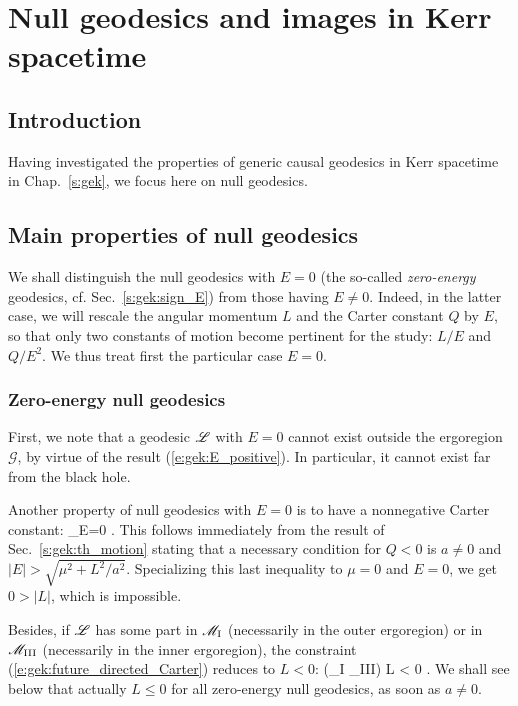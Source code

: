 \chapter{Null geodesics and images in Kerr spacetime}
\label{s:gik}

\minitoc

\section{Introduction}

Having investigated the properties of generic causal geodesics
in Kerr spacetime in Chap.~\ref{s:gek}, we focus here on null
geodesics.


\section{Main properties of null geodesics} \label{s:gik:properties}

We shall distinguish the null geodesics with $E=0$ (the so-called \emph{zero-energy} geodesics,
cf. Sec.~\ref{s:gek:sign_E})
 from those having
$E \neq 0$. Indeed, in the latter case, we will rescale the angular momentum
$L$ and the Carter constant $Q$ by $E$, so that only two constants of motion become
pertinent for the study: $L/E$ and $Q/E^2$.
We thus treat first the particular case $E=0$.

\subsection{Zero-energy null geodesics} \label{s:gik:zero_energy}

First, we note that a geodesic $\mathscr{L}$ with $E=0$ cannot exist outside the ergoregion
$\mathscr{G}$, by virtue of the result (\ref{e:gek:E_positive}). In particular,
it cannot exist far from the black hole.

Another property of null geodesics with $E=0$ is to have a nonnegative Carter constant:
\be \label{e:gik:Q_nonneg_E_zero}
   _{E=0} .
\ee
This follows immediately from the result of Sec.~\ref{s:gek:th_motion}
stating that a necessary condition for $Q < 0$ is $a\neq 0$ and
$|E| > \sqrt{\mu^2 + L^2/a^2}$. Specializing this last inequality to $\mu=0$
and $E=0$, we get $0 > |L|$, which is impossible.

Besides, if $\mathscr{L}$ has some part in $\mathscr{M}_{\rm I}$ (necessarily in the outer ergoregion)
or in $\mathscr{M}_{\rm III}$ (necessarily in the inner ergoregion),
the constraint (\ref{e:gek:future_directed_Carter})
reduces to $L<0$:
\be \label{e:gik:E_zero_L_neg_ergo}
    \Li \cap (\M_{\rm I} \cup \M_{\rm III}) \neq  \varnothing \quad \Longrightarrow \quad L < 0 .
\ee
We shall see below that actually $L \leq 0$ for all zero-energy null geodesics, as soon as $a\neq 0$.

